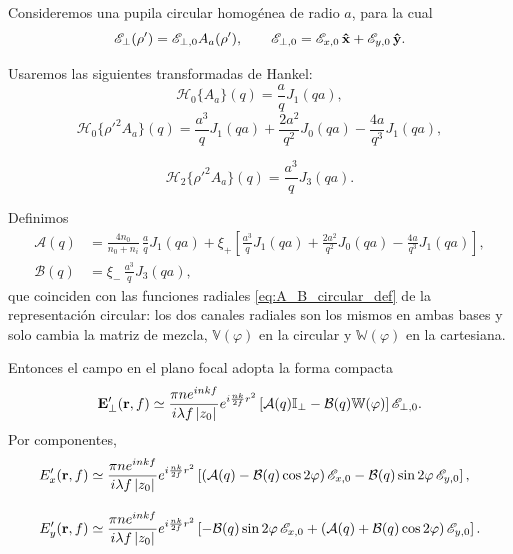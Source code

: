 Consideremos una pupila circular homogénea de radio $a$, para la cual
\begin{equation}
\mathscr E_\perp(\rho')
=
\mathscr E_{\perp,0}A_a(\rho'),
\qquad
\mathscr E_{\perp,0}
=
\mathscr E_{x,0}\,\bm{\hat{\mathbf{x}}}
+
\mathscr E_{y,0}\,\bm{\hat{\mathbf{y}}}.
\label{eq:cartesian_homogeneous_pupil_def}
\end{equation}

Usaremos las siguientes transformadas de Hankel:
\begin{equation}
\mathscr H_0\{A_a\}(q)
=
\frac{a}{q}J_1(qa),
\label{eq:H0_Aa_cartesian}
\end{equation}
\begin{equation}
\mathscr H_0\{\rho'^2A_a\}(q)
=
\frac{a^3}{q}J_1(qa)
+
\frac{2a^2}{q^2}J_0(qa)
-
\frac{4a}{q^3}J_1(qa),
\label{eq:H0_rho2_Aa_cartesian}
\end{equation}

\begin{equation}
\mathscr H_2\{\rho'^2A_a\}(q)
=
\frac{a^3}{q}J_3(qa).
\label{eq:H2_rho2_Aa_cartesian}
\end{equation}

Definimos
\begin{equation}
\begin{aligned}
\mathcal A(q)
&=
\frac{4n_0}{n_0+n_i}\,
\frac{a}{q}J_1(qa)
+
\xi_+
\left[
\frac{a^3}{q}J_1(qa)
+
\frac{2a^2}{q^2}J_0(qa)
-
\frac{4a}{q^3}J_1(qa)
\right],
\\[0.5em]
\mathcal B(q)
&=
\xi_-\,
\frac{a^3}{q}J_3(qa),
\end{aligned}
\label{eq:A_B_cartesian_def}
\end{equation}
que coinciden con las funciones radiales \eqref{eq:A_B_circular_def} de la representación circular: los dos canales radiales son los mismos en ambas bases y solo cambia la matriz de mezcla, $\mathbb V(\varphi)$ en la circular y $\mathbb W(\varphi)$ en la cartesiana.

Entonces el campo en el plano focal adopta la forma compacta
\begin{equation}
\vb E'_\perp(\vb r,f)
\simeq
\frac{\pi n e^{inkf}}{i\lambda f\,|z_0|}
e^{i\frac{nk}{2f}r^2}
\left[
\mathcal A(q)\mathbb I_\perp
-
\mathcal B(q)\mathbb W(\varphi)
\right]
\mathscr E_{\perp,0}.
\label{eq:E_field_cartesian_homogeneous}
\end{equation}
Por componentes,
\begin{equation}
\begin{aligned}
E'_x(\vb r,f)
&\simeq
\frac{\pi n e^{inkf}}{i\lambda f\,|z_0|}
e^{i\frac{nk}{2f}r^2}
\left[
\left(
\mathcal A(q)-\mathcal B(q)\cos2\varphi
\right)\mathscr E_{x,0}
-
\mathcal B(q)\sin2\varphi\,\mathscr E_{y,0}
\right],
\\[1em]
E'_y(\vb r,f)
&\simeq
\frac{\pi n e^{inkf}}{i\lambda f\,|z_0|}
e^{i\frac{nk}{2f}r^2}
\left[
-
\mathcal B(q)\sin2\varphi\,\mathscr E_{x,0}
+
\left(
\mathcal A(q)+\mathcal B(q)\cos2\varphi
\right)\mathscr E_{y,0}
\right].
\end{aligned}
\label{eq:Ex_Ey_cartesian_homogeneous}
\end{equation}

